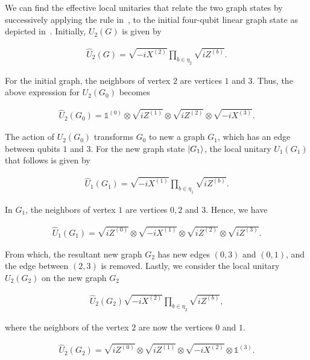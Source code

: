 \bigskip
\noindent
We can find the effective local unitaries that relate the two graph states by successively applying the rule in~, to the initial four-qubit linear graph state as depicted in~. Initially, $U_2(G)$ is given by

\begin{align}
    \hat{U}_2(G) =  \sqrt{- i X^{(2)}} \displaystyle\prod_{b \in
    \eta_2} \sqrt{i Z^{(b)}}.
\end{align}

\noindent
For the initial graph, the neighbors of vertex $2$ are vertices $1$ and $3$. Thus, the above expression for $U_2(G_0)$ becomes

\begin{align}
    \hat{U}_2(G_0) =  \mathds{1}^{(0)}\otimes\sqrt{i Z^{(1)}}\otimes\sqrt{i Z^{(2)}}\otimes\sqrt{-i X^{(3)}}.
\end{align}

\noindent
The action of $U_2(G_0)$ transforms $G_0$ to new a graph $G_1$, which has an edge between qubits $1$ and $3$. For the new graph state $\ket{G_1}$, the local unitary $U_1(G_1)$ that follows is given by


\begin{align}
    \hat{U}_1(G_1) = \sqrt{-i X^{(1)}}\displaystyle\prod_{b \in \eta_1}
    \sqrt{i Z^{(b)}}.
\end{align}

\noindent
In $G_1$, the neighbors of vertex $1$ are vertices $0,2$ and $3$. Hence, we have

\begin{align}
    \hat{U}_1(G_1) = \sqrt{i Z^{(0)}} \otimes \sqrt{-i X^{(1)}} \otimes \sqrt{i Z^{(2)}} \otimes \sqrt{i Z^{(3)}}.
\end{align}

\noindent
From which, the resultant new graph $G_2$ has new edges $(0,3)$ and $(0,1)$, and the edge between $(2,3)$ is removed. Lastly, we consider the local unitary $U_2(G_2)$ on the new graph $G_2$

\begin{align}
    \hat{U}_2(G_2) \sqrt{-i X^{(2)}} \displaystyle\prod_{b \in
    \eta_2} \sqrt{i Z^{(b)}},
\end{align}

\noindent
where the neighbors of the vertex $2$ are now the vertices $0$ and $1$.

\begin{align}
    \hat{U}_2(G_2) = \sqrt{i Z^{(0)}} \otimes \sqrt{i Z^{(1)}} \otimes \sqrt{-i X^{(2)}} \otimes \mathds{1}^{(3)}.
\end{align}

